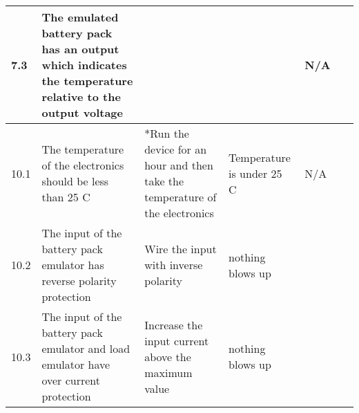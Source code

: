 \begin{table*}[!ht]
\begin{tabular}{|p{0.3cm}|p{3cm}|p{7cm}|p{3cm}|p{1.5cm}|p{1cm}|}
        7.3 & The emulated battery pack has an output which indicates the temperature relative to the output voltage & ~ & ~ & N/A & ~ \\ \hline
        10.1 & The temperature of the electronics should be less than 25 C & *Run the device for an hour and then take the temperature of the electronics & Temperature is under 25 C & N/A & ~ \\ \hline
        10.2 & The input of the battery pack emulator has reverse polarity protection & Wire the input with inverse polarity  & nothing blows up & ~ & ~ \\ \hline
        10.3 & The input of the battery pack emulator and load emulator have over current protection & Increase the input current above the maximum value  & nothing blows up  & ~ & ~ \\ \hline
    \end{tabular}
    \label{Test Plan}
\end{table*}